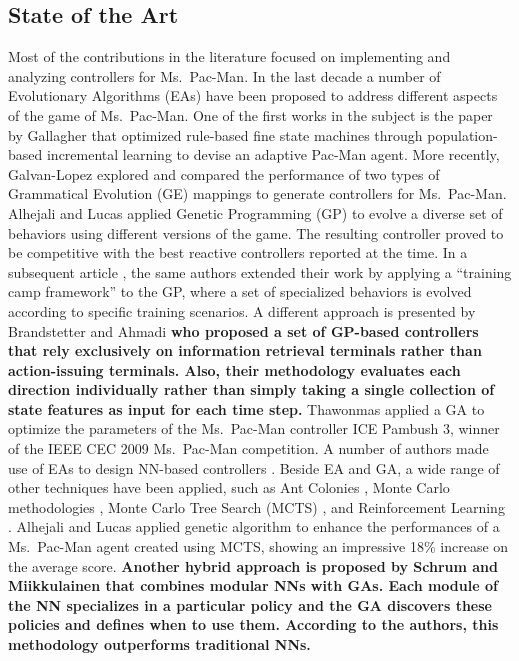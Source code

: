 \documentclass[journal]{IEEEtran}
\begin{document}
\subsection{State of the Art}
Most of the contributions in the literature focused on implementing and analyzing controllers for Ms.\  Pac-Man. In the last decade a number of Evolutionary Algorithms (EAs) have been proposed to address different aspects of the game of Ms.\  Pac-Man. One of the first works in the subject is the paper by Gallagher \cite{Gallagher03} that optimized rule-based fine state machines through population-based incremental learning to devise an adaptive Pac-Man agent. More recently, Galvan-Lopez \cite{Galvan-Lopez10} explored and compared the performance of two types of Grammatical Evolution (GE) mappings to generate controllers for Ms.\  Pac-Man. Alhejali and Lucas \cite{Alhejali10} applied Genetic Programming (GP) to evolve a diverse set of behaviors using different versions of the game. The resulting controller proved to be competitive with the best reactive controllers reported at the time. In a subsequent article \cite{AlhejaliLucas11}, the same authors extended their work by applying a ``training camp framework'' to the GP, where a set of specialized behaviors is evolved according to specific training scenarios. A different approach is presented by Brandstetter and Ahmadi \cite{Brandstetter12} \textbf{who proposed a set of GP-based controllers that rely exclusively on information retrieval terminals rather than action-issuing terminals. Also, their methodology evaluates each direction individually rather than simply taking a single collection of state features as input for each time step.} Thawonmas \cite{Thawonmas10} applied a GA to optimize the parameters of the Ms.\  Pac-Man controller ICE Pambush 3, winner of the IEEE CEC 2009 Ms.\  Pac-Man competition. A number of authors made use of EAs to design NN-based controllers \cite{Lucas05,Burrow09,Keunhyun10}. Beside EA and GA, a wide range of other techniques have been applied, such as  Ant Colonies \cite{Emilio2010}, Monte Carlo methodologies \cite{Tong2010,Tong2011}, Monte Carlo Tree Search (MCTS) \cite{Samothrakis2011, Ikehata2011}, and Reinforcement Learning \cite{Bom2013}. Alhejali and Lucas \cite{Alhejali2013} applied genetic algorithm to enhance the performances of a Ms.\  Pac-Man agent created using MCTS, showing an impressive 18\% increase on the average score. \textbf{Another hybrid approach is proposed by Schrum and Miikkulainen \cite{Schrum2014} that combines modular NNs with GAs. Each module of the NN specializes in a particular policy and the GA discovers these policies and defines when to use them. According to the authors, this methodology outperforms traditional NNs.}
\end{document}
